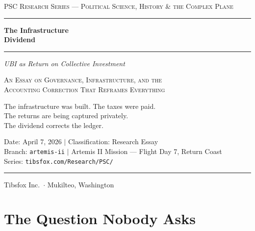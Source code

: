 \documentclass[11pt,letterpaper]{article}
\begin{document}
\begin{titlepage}
\centering
\vspace*{2cm}

{\small\textsc{\color{pscgold}PSC Research Series --- Political Science, History \& the Complex Plane}}

\vspace{0.5cm}
\rule{\textwidth}{1.5pt}
\vspace{0.8cm}

{\Huge\bfseries\color{pscpurple} The Infrastructure\\[0.3cm]
Dividend}

\vspace{0.6cm}
\rule{0.6\textwidth}{0.4pt}
\vspace{0.6cm}

{\Large\itshape UBI as Return on Collective Investment}

\vspace{1.5cm}

{\large\textsc{An Essay on Governance, Infrastructure, and the\\Accounting Correction That Reframes Everything}}

\vspace{0.5cm}

{\normalsize The infrastructure was built. The taxes were paid.\\
The returns are being captured privately.\\
The dividend corrects the ledger.}

\vfill

{\small
Date: April 7, 2026 \(\vert\) Classification: Research Essay\\
Branch: \texttt{artemis-ii} \(\vert\) Artemis II Mission --- Flight Day 7, Return Coast\\
Series: \texttt{tibsfox.com/Research/PSC/}
}

\vspace{0.5cm}
\rule{\textwidth}{1.5pt}
\vspace{0.3cm}
{\footnotesize Tibsfox Inc.\ \(\cdot\) Mukilteo, Washington}
\end{titlepage}

\section{The Question Nobody Asks}
\end{document}

